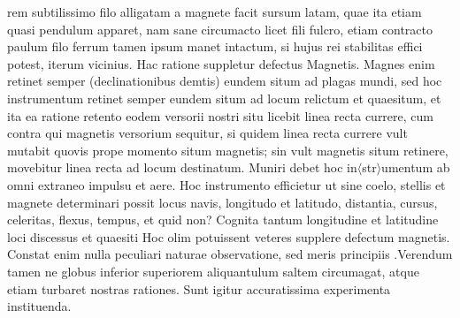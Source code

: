 {\protect{} rem subtilissimo filo alligatam a magnete\protect{} facit sursum latam, quae ita etiam quasi pendulum\protect{} apparet, nam sane circumacto licet fili fulcro, etiam contracto paulum filo ferrum tamen ipsum manet \protect{} intactum, si hujus rei stabilitas effici potest, iterum vicinius. }\pend \pstart Hac ratione suppletur defectus Magnetis\protect{}. Magnes\protect{} enim retinet semper (declinationibus\protect{} demtis) eundem situm ad plagas mundi, sed hoc instrumentum retinet semper eundem situm ad locum relictum et quaesitum, et ita ea ratione retento eodem versorii nostri situ licebit linea recta currere, cum contra qui magnetis\protect{} versorium sequitur, si quidem linea recta currere vult mutabit quovis prope momento situm magnetis\protect{}; sin vult magnetis \protect{} situm retinere,  movebitur linea recta ad locum destinatum. Muniri debet hoc in$\langle$str$\rangle$umentum ab omni extraneo impulsu et aere.  Hoc instrumento efficietur ut sine coelo, stellis\protect{} et magnete\protect{} determinari possit locus navis\protect{}, longitudo \protect{} et latitudo\protect{}, distantia, cursus, celeritas\protect{}, flexus, tempus, et quid non? Cognita tantum longitudine\protect{} et latitudine\protect{} loci discessus et quaesiti \pend \pstart Hoc olim potuissent veteres supplere defectum magnetis\protect{}. Constat enim nulla peculiari naturae observatione, sed meris principiis .\pend \pstart Verendum tamen ne globus inferior superiorem aliquantulum saltem circumagat, atque etiam turbaret nostras rationes. Sunt igitur accuratissima experimenta instituenda.\pend 